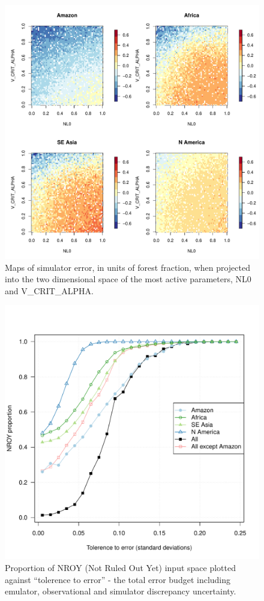 \documentclass[esd, manuscript]{copernicus}
\begin{document}
\begin{figure}[t]
\includegraphics[width=12cm]{graphics/discrepancy_parameter_space.pdf}
\caption{Maps of simulator error, in units of forest fraction, when projected into the two dimensional space of the most active parameters, NL0 and V\_CRIT\_ALPHA.}
\label{fig:discrepancy_parameter_space}
\end{figure}

\begin{figure}[t]
\includegraphics[width=12cm]{graphics/Prop_NROY_tolerance_unc.pdf}
\caption{Proportion of NROY (Not Ruled Out Yet) input space plotted against ``tolerence to error'' - the total error budget including emulator, observational and simulator discrepancy uncertainty.}
\label{fig:Prop_NROY_tolerance_unc}
\end{figure}
\end{document}
